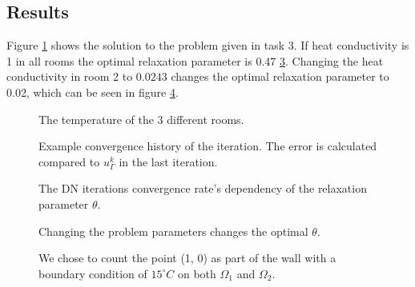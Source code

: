 \documentclass[12pt,a4paper]{report}
\begin{document}
	\subsection*{Results}
	Figure \ref{tempdist} shows the solution to the problem given in task 3. If heat conductivity is 1 in all rooms the optimal relaxation parameter is 0.47 \ref{fig:vary_theta}. Changing the heat conductivity in room 2 to $0.0243$ changes the optimal relaxation parameter to 0.02, which can be seen in figure \ref{fig:vary_theta_other_heat_cond}.  
	
	
	\begin{figure}
		\centering
		
		\caption{The temperature of the 3 different rooms.}
		\label{tempdist}
	\end{figure}
	
	\begin{figure}
		\centering
		
		\caption{\label{fig:convergence}Example convergence history of the iteration. The error is calculated compared to $u_\Gamma^k$ in the last iteration.}
	\end{figure}
	
	\begin{figure}
		\centering
		
		\caption{The DN iterations convergence rate's dependency of the relaxation parameter $\theta$.}
		\label{fig:vary_theta}
	\end{figure}
	
	
	\begin{figure}
		\centering
		
		\caption{Changing the problem parameters changes the optimal $\theta$.}
		\label{fig:vary_theta_other_heat_cond}
	\end{figure}
	
	\begin{figure}
		\centering
		
		\caption{We chose to count the point (1, 0) as part of the wall with a boundary condition of $15^\circ C$ on both $\Omega_1$ and $\Omega_2$.}
		\label{WindowWall}
	\end{figure}
	

	
\end{document}
